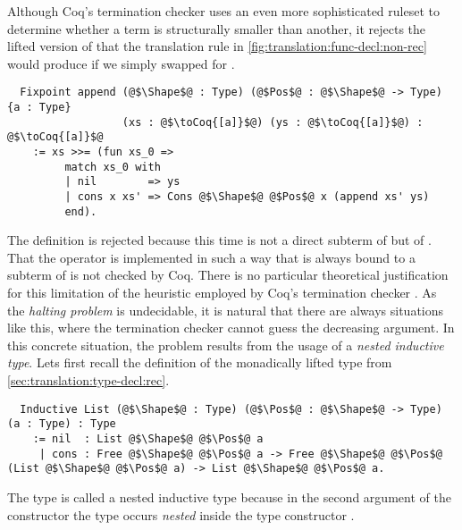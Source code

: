 Although Coq's termination checker uses an even more sophisticated ruleset to determine whether a term is structurally smaller than another, it rejects the lifted version of  that the translation rule in \autoref{fig:translation:func-decl:non-rec} would produce if we simply swapped  for .
\begin{verbatim}
  Fixpoint append (@$\Shape$@ : Type) (@$Pos$@ : @$\Shape$@ -> Type) {a : Type}
                  (xs : @$\toCoq{[a]}$@) (ys : @$\toCoq{[a]}$@) : @$\toCoq{[a]}$@
    := xs >>= (fun xs_0 =>
         match xs_0 with
         | nil        => ys
         | cons x xs' => Cons @$\Shape$@ @$Pos$@ x (append xs' ys)
         end).
\end{verbatim}
The definition is rejected because this time  is not a direct subterm of  but of .
That the \coq{>>=} operator is implemented in such a way that  is always bound to a subterm of  is not checked by Coq.
There is no particular theoretical justification for this limitation of the heuristic employed by Coq's termination checker \cite[p.~62]{Chlipala:2013}.
As the \textit{halting problem} is undecidable, it is natural that there are always situations like this, where the termination checker cannot guess the decreasing argument.
In this concrete situation, the problem results from the usage of a \textit{nested inductive type}.
Lets first recall the definition of the monadically lifted  type from \autoref{sec:translation:type-decl:rec}.
\begin{verbatim}
  Inductive List (@$\Shape$@ : Type) (@$\Pos$@ : @$\Shape$@ -> Type) (a : Type) : Type
    := nil  : List @$\Shape$@ @$\Pos$@ a
     | cons : Free @$\Shape$@ @$\Pos$@ a -> Free @$\Shape$@ @$\Pos$@ (List @$\Shape$@ @$\Pos$@ a) -> List @$\Shape$@ @$\Pos$@ a.
\end{verbatim}
The  type is called a nested inductive type because in the second argument of the  constructor the type  occurs \textit{nested} inside the type constructor  \cite[p.~29]{Dylus:2018}.

